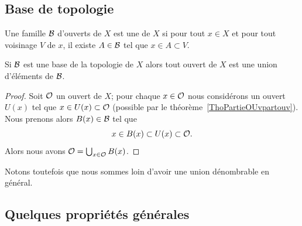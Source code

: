 \subsection{Base de topologie}

\begin{definition}   \label{DefQELfbBEyiB}
    Une famille \( \mathcal{B}\) d'ouverts de \( X\) est une  de \( X\) si pour tout \( x\in X\) et pour tout voisinage \( V\) de \( x\), il existe \( A\in \mathcal{B}\) tel que \( x\in A\subset V\).
\end{definition}

\begin{proposition} \label{PropMMKBjgY}
    Si \( \mathcal{B}\) est une base de la topologie de \( X\) alors tout ouvert de \( X\) est une union d'éléments de \( \mathcal{B}\).
\end{proposition}

\begin{proof}
    Soit \( \mathcal{O}\) un ouvert de \( X\); pour chaque \( x\in\mathcal{O}\) nous considérons un ouvert \( U(x)\) tel que \( x\in U(x)\subset \mathcal{O}\) (possible par le théorème~\ref{ThoPartieOUvpartouv}). Nous prenons alors \( B(x)\in\mathcal{B}\) tel que
    \begin{equation}
        x\in B(x)\subset U(x)\subset \mathcal{O}.
    \end{equation}
    Alors nous avons \( \mathcal{O}=\bigcup_{x\in \mathcal{O}}B(x)\).
\end{proof}
Notons toutefois que nous sommes loin d'avoir une union dénombrable en général.

\subsection{Quelques propriétés générales}

